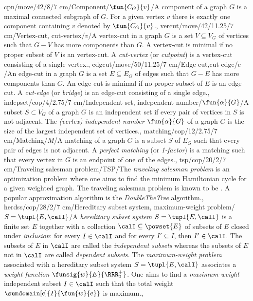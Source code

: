 cpn/move/42/8/7 cm/{Component}/{$\fun{C_G}{v}$}/{A component of a graph $G$ is a maximal connected subgraph of $G$. For a given vertex $v$ there is exactly one component containing $v$ denoted by $\fun{C_G}{v}$.},
vercut/move/42/11.25/7 cm/{Vertex-cut, cut-vertex}/{\Rightscissors$v$}/{A vertex-cut in a graph $G$ is a set $V\subseteq V_G$ of vertices such that $G-V$ has more components than $G$. A vertex-cut is minimal if no proper subset of $V$ is an vertex-cut. A \emph{cut-vertex} (or \emph{cutpoint}) is a vertex-cut consisting of a single vertex.},
edgcut/move/50/11.25/7 cm/{Edge-cut,cut-edge}/{\Rightscissors$e$}/{An edge-cut in a graph $G$ is a set $E\subseteq E_G$ of edges such that $G-E$ has more components than $G$. An edge-cut is minimal if no proper subset of $E$ is an edge-cut. A \emph{cut-edge} (or \emph{bridge}) is an edge-cut consisting of a single edge.},
indepset/cop/4/2.75/7 cm/{Independent set, independent number}/{$\fun{\alpha}{G}$}/{A subset $S\subset V_G$ of a graph $G$ is an independent set if every pair of vertices in $S$ is not adjacent. The \emph{(vertex) independent number} $\fun{\alpha}{G}$ of a graph $G$ is the size of the largest independent set of vertices.},
matching/cop/12/2.75/7 cm/{Matching}/{$M$}/{A matching of a graph $G$ is a subset $S$ of $E_G$ such that every pair of edges is not adjacent. A \emph{perfect matching} (or \emph{1-factor}) is a matching such that every vertex in $G$ is an endpoint of one of the edges.},
tsp/cop/20/2/7 cm/{Traveling salesman problem}/{TSP}/{The \emph{traveling salesman problem} is an optimization problem where one aims to find the minimum Hamiltonian cycle for a given weighted graph. The traveling salesman problem is known to be \ccnph{}. A popular approximation algorithm is the \emph{DoubleTheTree} algorithm.},
herdss/cop/28/2/7 cm/{Hereditary subset system, maximum-weight problem}/{$S=\tupl{E,\calI}$}/{A \emph{hereditary subset system} $S=\tupl{E,\calI}$ is a finite set $E$ together with a collection $\calI\subseteq\powset{E}$ of subsets of $E$ closed under \emph{inclusion}: for every $I\in\calI$ and for every $I'\subseteq I$, then $I'\in\calI$. The subsets of $E$ in $\calI$ are called the \emph{independent subsets} whereas the subsets of $E$ not in $\calI$ are called \emph{dependent subsets}. The \emph{maximum-weight problem} associated with a hereditary subset system $S=\tupl{E,\calI}$ associates a \emph{weight function} $\funsig{w}{E}{\RRR^+_0}$. One aims to find a \emph{maximum-weight} independent subset $I\in\calI$ such that the total weight $\sumdomain[e]{I}{\fun{w}{e}}$ is maximum.},
